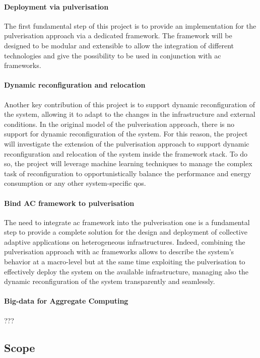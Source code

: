 \documentclass[12pt]{article}
\newcommand{\meta}[1]{{\color{blue}#1}}
\begin{document}
\meta{
\paragraph{Deployment via pulverisation}
The first fundamental step of this project is to provide an implementation for
the pulverisation approach via a dedicated framework.
%
The framework will be designed to be modular and extensible to allow the integration
of different technologies and give the possibility to be used in conjunction with
\ac{ac} frameworks.

\paragraph{Dynamic reconfiguration and relocation}
Another key contribution of this project is to support dynamic reconfiguration of the system,
allowing it to adapt to the changes in the infrastructure and external conditions.
%
In the original model of the pulverisation approach,
there is no support for dynamic reconfiguration of the system.
%
For this reason,
the project will investigate the extension of the pulverisation approach
to support dynamic reconfiguration and relocation of the system inside the framework stack.
%
To do so,
the project will leverage machine learning techniques to manage the complex task of reconfiguration
to opportunistically balance the performance and energy consumption or any other system-specific \ac{qos}.

\paragraph{Bind AC framework to pulverisation}
The need to integrate \ac{ac} framework into the pulverisation one is
a fundamental step to provide a complete solution for the design and deployment of
collective adaptive applications on heterogeneous infrastructures.
%
Indeed, combining the pulverisation approach with \ac{ac} frameworks
allows to describe the system's behavior at a macro-level
but at the same time exploiting the pulverisation to
effectively deploy the system on the available infrastructure,
managing also the dynamic reconfiguration of the system transparently and seamlessly.

\paragraph{Big-data for Aggregate Computing}
???
}

\subsection{Scope}\label{subsec:scope}
\end{document}
